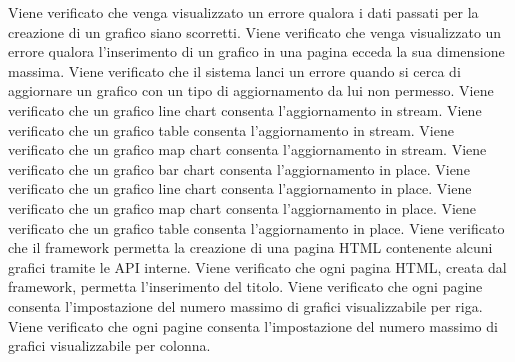 Viene verificato che venga visualizzato un errore qualora i dati passati per la creazione di un grafico siano scorretti.
Viene verificato che venga visualizzato un errore qualora l'inserimento di un grafico in una pagina ecceda la sua dimensione massima.
Viene verificato che il sistema lanci un errore quando si cerca di aggiornare un grafico con un tipo di aggiornamento da lui non permesso.
Viene verificato che un grafico line chart consenta l'aggiornamento in stream.
Viene verificato che un grafico table consenta l'aggiornamento in stream.
Viene verificato che un grafico map chart consenta l'aggiornamento in stream.
Viene verificato che un grafico bar chart consenta l'aggiornamento in place.
Viene verificato che un grafico line chart consenta l'aggiornamento in place.
Viene verificato che un grafico map chart consenta l'aggiornamento in place.
Viene verificato che un grafico table consenta l'aggiornamento in place.
Viene verificato che il framework permetta la creazione di una pagina HTML contenente alcuni grafici tramite le API interne.
Viene verificato che ogni pagina HTML, creata dal framework, permetta l'inserimento del titolo.
Viene verificato che ogni pagine consenta l'impostazione del numero massimo di grafici visualizzabile per riga.
Viene verificato che ogni pagine consenta l'impostazione del numero massimo di grafici visualizzabile per colonna.
